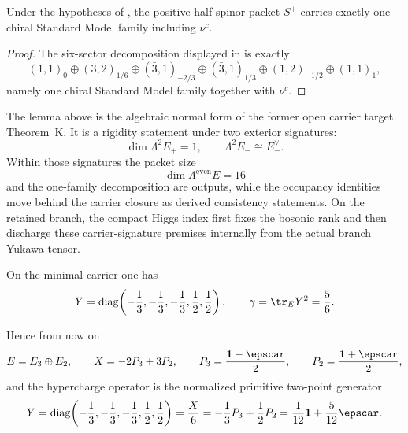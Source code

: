\begin{corollary}
Under the hypotheses of , the positive half-spinor packet $S^+$
carries exactly one chiral Standard Model family including $\nu^c$.
\end{corollary}

\begin{proof}
The six-sector decomposition displayed in  is exactly
\[
(1,1)_0\oplus(3,2)_{1/6}\oplus(\bar 3,1)_{-2/3}\oplus(\bar 3,1)_{1/3}\oplus(1,2)_{-1/2}\oplus(1,1)_1,
\]
namely one chiral Standard Model family together with $\nu^c$.
\end{proof}

\begin{remark}
The lemma above is the algebraic normal form of the former open carrier target Theorem~K. It is a rigidity
statement under two exterior signatures:
\[
\dim \Lambda^2 E_+=1,
\qquad
\Lambda^2 E_- \cong E_-^\vee.
\]
Within those signatures the packet size
\[
\dim\Lambda^{\mathrm{even}}E=16
\]
and the one-family decomposition are outputs, while the occupancy identities move behind the
carrier closure as derived consistency statements. On the retained branch, the compact Higgs index
first fixes the bosonic rank and  then
discharge these carrier-signature premises internally from the actual branch Yukawa tensor.
\end{remark}

\begin{corollary}
On the minimal carrier one has
\[
Y
=
\mathrm{diag}\!\left(-\frac13,-\frac13,-\frac13,\frac12,\frac12\right),
\qquad
\gamma=\tr_EY^2=\frac56.
\]
\end{corollary}

Hence from now on
\[
E=E_3\oplus E_2,
\qquad
X=-2P_3+3P_2,
\qquad
P_3=\frac{\mathbf 1-\epscar}{2},
\qquad
P_2=\frac{\mathbf 1+\epscar}{2},
\]
and the hypercharge operator is the normalized primitive two-point generator
\begin{equation}
\label{eq:explicit-hypercharge}
Y
=
\mathrm{diag}\!\left(-\frac13,-\frac13,-\frac13,\frac12,\frac12\right)
=
\frac{X}{6}
=
-\frac13 P_3+\frac12 P_2
=
\frac1{12}\mathbf 1+\frac5{12}\epscar.
\end{equation}

